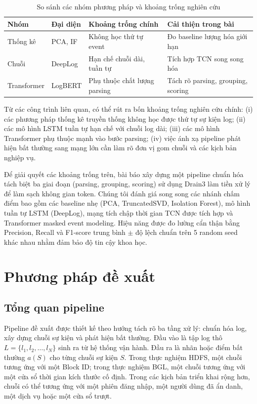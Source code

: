 \documentclass[conference]{IEEEtran}
\begin{document}
\begin{table}[htbp]
\caption{So sánh các nhóm phương pháp và khoảng trống nghiên cứu}
\begin{center}
\scriptsize
\setlength{\tabcolsep}{3pt}
\begin{tabular}{lp{1.6cm}p{2.3cm}p{2.1cm}}
\toprule
\textbf{Nhóm} & \textbf{Đại diện} & \textbf{Khoảng trống chính} & \textbf{Cải thiện trong bài} \\
\midrule
Thống kê & PCA, IF \cite{b10,b11} & Không học thứ tự event & Đo baseline lượng hóa giới hạn \\
Chuỗi & DeepLog \cite{b1,b13} & Hạn chế chuỗi dài, tuần tự & Tích hợp TCN song song hóa \\
Transformer & LogBERT \cite{b2} & Phụ thuộc chất lượng parsing & Tách rõ parsing, grouping, scoring \\
\bottomrule
\end{tabular}
\label{tab_related_work}
\end{center}
\end{table}

Từ các công trình liên quan, có thể rút ra bốn khoảng trống nghiên cứu chính: (i) các phương pháp thống kê truyền thống không học được thứ tự sự kiện log; (ii) các mô hình LSTM tuần tự hạn chế với chuỗi log dài; (iii) các mô hình Transformer phụ thuộc mạnh vào bước parsing; (iv) việc ánh xạ pipeline phát hiện bất thường sang mạng lớn cần làm rõ đơn vị gom chuỗi và các kịch bản nghiệp vụ. 

Để giải quyết các khoảng trống trên, bài báo xây dựng một pipeline chuẩn hóa tách biệt ba giai đoạn (parsing, grouping, scoring) sử dụng Drain3 làm tiền xử lý để làm sạch không gian token. Chúng tôi đánh giá song song các nhánh chấm điểm bao gồm các baseline nhẹ (PCA, TruncatedSVD, Isolation Forest), mô hình tuần tự LSTM (DeepLog), mạng tích chập thời gian TCN được tích hợp và Transformer masked event modeling. Hiệu năng được đo lường cẩn thận bằng Precision, Recall và F1-score trung bình $\pm$ độ lệch chuẩn trên 5 random seed khác nhau nhằm đảm bảo độ tin cậy khoa học.


\section{Phương pháp đề xuất}
\subsection{Tổng quan pipeline}
Pipeline đề xuất được thiết kế theo hướng tách rõ ba tầng xử lý: chuẩn hóa log, xây dựng chuỗi sự kiện và phát hiện bất thường. Đầu vào là tập log thô $L=\{l_1,l_2,\ldots,l_N\}$ sinh ra từ hệ thống vận hành. Đầu ra là nhãn hoặc điểm bất thường $a(S)$ cho từng chuỗi sự kiện $S$. Trong thực nghiệm HDFS, một chuỗi tương ứng với một Block ID; trong thực nghiệm BGL, một chuỗi tương ứng với một cửa sổ thời gian kích thước cố định. Trong các kịch bản triển khai rộng hơn, chuỗi có thể tương ứng với một phiên đăng nhập, một người dùng đã ẩn danh, một dịch vụ hoặc một cửa sổ trượt.
\end{document}

